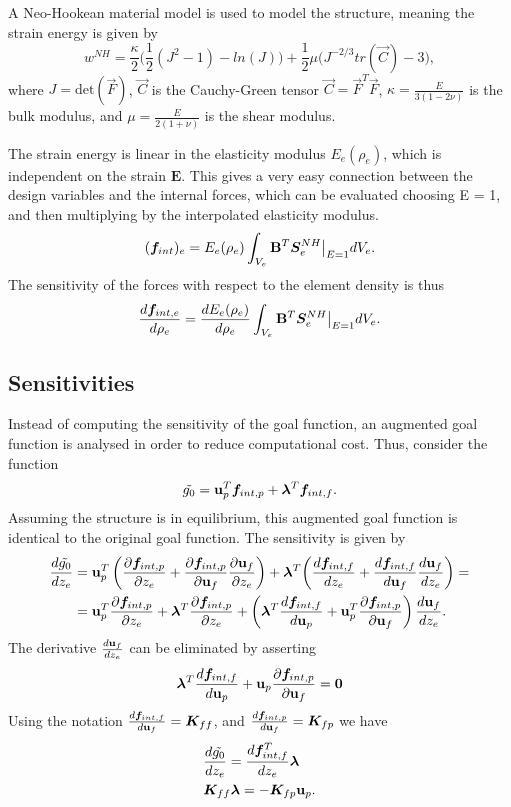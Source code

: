 \documentclass{article}
\begin{document}
A Neo-Hookean material model is used to model the structure, meaning the strain energy is given by
$$
w^{NH} = \frac{\kappa}{2}\bigg(\frac{1}{2}(J^2 - 1) - ln(J)\bigg) + \frac{1}{2}\mu \bigg(J^{-2/3}tr(\Vec{C}) - 3\bigg),
$$
where $J = \text{det}(\vec{F})$, $\vec{C}$ is the Cauchy-Green tensor $\vec{C} = \vec{F}^T \vec{F}$, $\kappa  = \frac{E}{3(1 - 2\nu)}$ is the bulk modulus, and $\mu = \frac{E}{2(1 + \nu)}$ is the shear modulus.

The strain energy is linear in the elasticity modulus $E_e(\rho_e)$, which is independent on the strain $\bm E$. This gives a very easy connection between the design variables and the internal forces, which can be evaluated choosing E = 1, and then multiplying by the interpolated elasticity modulus.
$$
(\boldsymbol{f}_{int})_e = E_e(\rho_e) \int_{V_e} \mathbf{B}^T \bm S^{NH}_e\big |_{E = 1}dV_e.
$$
The sensitivity of the forces with respect to the element density is thus
$$
\frac{d\boldsymbol{f}_{int, e}}{d\rho_e} = \frac{dE_e(\rho_e)}{d\rho_e}\int_{V_e} \mathbf{B}^T \bm S^{NH}_e\big |_{E = 1}dV_e.
$$
\subsection{Sensitivities}
Instead of computing the sensitivity of the goal function, an augmented goal function is analysed in order to reduce computational cost. Thus, consider the function
$$
\Tilde{g_0} = \bm {\mathbf{u}}_p^T\boldsymbol{f}_{int, p} + \bm \lambda^T\boldsymbol{f}_{int, f}.
$$
Assuming the structure is in equilibrium, this augmented goal function is identical to the original goal function. The sensitivity is given by
\begin{align*}
\frac{d \Tilde{g_0}}{dz_e} & = \mathbf{u}_p^T\left(\frac{\partial \boldsymbol{f}_{int, p}}{\partial z_e} + \frac{\partial \boldsymbol{f}_{int, p}}{\partial \mathbf{u}_f}\frac{\partial \mathbf{u}_f}{\partial z_e}\right) + \bm \lambda^T\bigg(\frac{d \boldsymbol{f}_{int, f}}{dz_e} + \frac{d \boldsymbol{f}_{int, f}}{d\bm {\mathbf{u}}_f}\frac{d\bm {\mathbf{u}}_f}{dz_e}\bigg) = \\ 
& = \mathbf{u}_p^T\frac{\partial \boldsymbol{f}_{int, p}}{\partial z_e} + \bm \lambda^T \frac{\partial \boldsymbol{f}_{int, p}}{\partial z_e} + \left(\bm \lambda^T\frac{d\boldsymbol{f}_{int, f}}{d\bm {\mathbf{u}}_p} + \mathbf{u}_p^T \frac{\partial \boldsymbol{f}_{int, p}}{\partial \mathbf{u}_f}\right)\frac{d\bm {\mathbf{u}}_f}{dz_e}.
\end{align*}
The derivative $\frac{d\bm {\mathbf{u}}_f}{dz_e}$ can be eliminated by asserting 
$$
\bm \lambda^T\frac{d\boldsymbol{f}_{int, f}}{d\bm {\mathbf{u}}_p} + \mathbf{u}_p \frac{\partial \boldsymbol{f}_{int, p}}{\partial \mathbf{u}_f} = \bm 0
$$
Using the notation $\frac{d\boldsymbol{f}_{int, f}}{d\mathbf{u}_f} = \bm K_{ff}$, and $\frac{d\boldsymbol{f}_{int, p}}{d\mathbf{u}_f} = \bm K_{fp}$ we have
\begin{align}
    & \frac{d\Tilde{g_0}}{dz_e} = \frac{d\boldsymbol{f}_{int, f}^T}{dz_e}\bm \lambda \nonumber \\
    & \bm K_{ff}\bm \lambda = -\bm K_{fp}\mathbf{u}_p. \label{eq:sens}
\end{align}
\end{document}
